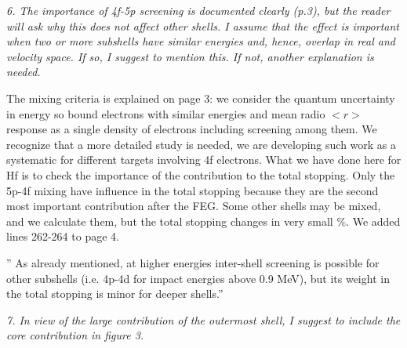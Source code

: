 \documentclass[a4paper,10pt]{article}
\begin{document}



\vspace{0.35cm}
\textsl{6. The importance of 4f-5p screening is documented clearly (p.3), but the reader will ask why this does not affect other shells. I assume that the effect is important when two or more subshells have similar energies and, hence, overlap in real and velocity space. If so, I suggest to mention this. If not, another explanation is needed.}

\vspace{0.1cm}
{\color{red} The mixing criteria is explained on page 3: we consider the quantum uncertainty in energy so bound electrons with similar energies and mean radio $<r>$ response as a single density of electrons including screening among them. We recognize that a more detailed study is needed, we are developing such work as a systematic for different targets involving 4f electrons. What we have done here for Hf is to check the importance of the contribution to the total stopping. Only the 5p-4f mixing have influence in the total stopping because they are the second most important contribution after the FEG. Some other shells may be mixed, and we calculate them, but the total stopping changes in very small $\%$.  We added lines 262-264 to page 4.}

{\small '' As already mentioned, at higher energies inter-shell screening is possible for other subshells (i.e. 4p-4d for impact energies above 0.9 MeV), but its weight in the total stopping is minor for deeper shells.'' }

\vspace{0.35cm}
\textsl{7. In view of the large contribution of the outermost shell, I 
suggest to include the core contribution in figure 3.}
\end{document}
